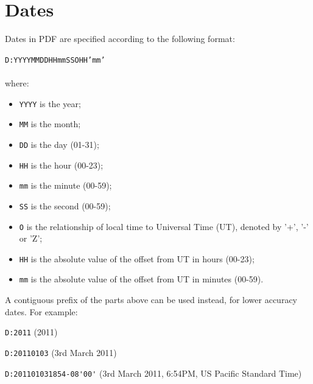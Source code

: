 \documentclass[a4paper]{memoir}
\begin{document}
\appendix
\chapter{Dates}
\label{dates}
Dates in PDF are specified according to the following format:

\begin{framed}
\texttt{D:YYYYMMDDHHmmSSOHH'mm'}\\\\where:

\begin{itemize}
  \item \texttt{YYYY} is the year;
  \item \texttt{MM} is the month;
  \item \texttt{DD} is the day (01-31);
  \item \texttt{HH} is the hour (00-23);
  \item \texttt{mm} is the minute (00-59);
  \item \texttt{SS} is the second (00-59);
  \item \texttt{O} is the relationship of local time to Universal Time (UT), denoted by '+', '-' or 'Z';
  \item \texttt{HH} is the absolute value of the offset from UT in hours (00-23);
  \item \texttt{mm} is the absolute value of the offset from UT in minutes (00-59).
\end{itemize}
\end{framed}

\noindent A contiguous prefix of the parts above can be used instead, for lower
accuracy dates. For example:

\begin{framed}
   \small\noindent\verb!D:2011! (2011)
   
   \vspace{1.5mm}
   \noindent\verb!D:20110103! (3rd March 2011)

   \vspace{1.5mm}
   \noindent\verb!D:201101031854-08'00'! (3rd March 2011, 6:54PM, US Pacific Standard Time)
   
\end{framed}
\end{document}
